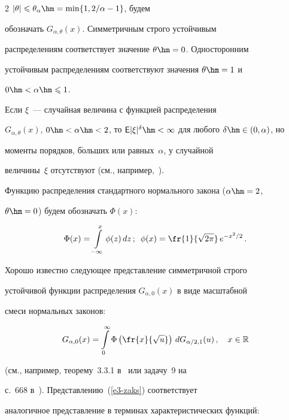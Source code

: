 \begin{multicols}{2}
$|\theta|\leqslant\theta_{\alpha}\hm=\min\{1,{2}/{\alpha}-1\}$, будем

обозначать $G_{\alpha,\theta}(x)$. Сим\-мет\-рич\-ным строго устойчивым

распределениям соответствует значение $\theta\hm=0$. Односторонним

устойчивым распределениям соответствуют значения $\theta\hm=1$ и

$0\hm<\alpha\hm\leqslant1$.



Если $\xi$~--- случайная величина с функцией распределения

$G_{\alpha,\theta}(x)$, $0\hm<\alpha\hm<2$, то ${\sf

E}|\xi|^{\delta}\hm<\infty$ для любого $\delta\hm\in(0,\alpha)$, но

моменты порядков, б$\acute{\mbox{о}}$льших или равных~$\alpha$, у случайной

величины~$\xi$ отсутствуют (см., например,~\cite{Zolotarev1983}).



Функцию распределения стандартного нормального закона ($\alpha\hm=2$,

$\theta\hm=0$) будем обозначать $\Phi(x)$:

$$

\Phi(x)=\int\limits_{-\infty}^x\phi(z)\,dz\,;\enskip

\phi(x)=\fr{1}{\sqrt{2\pi}}\,e^{-x^2/2}\,.

$$

Хорошо известно следующее представление сим\-мет\-рич\-ной строго

устойчивой функции распределения $G_{\alpha,0}(x)$ в виде масштабной

смеси нормальных законов:

\begin{equation}

G_{\alpha,0}(x)=\int\limits_{0}^{\infty}\Phi\left(\fr{x}{\sqrt{u}}\right)\,dG_{\alpha/2,1}(u)\,,\

\ \ x\in\mathbb{R}\label{e3-zaks}

\end{equation}

(см., например, теорему~3.3.1 в~\cite{Zolotarev1983} или задачу~9 на

с.~668 в~\cite{Feller1984}). Представлению~(\ref{e3-zaks}) соответствует

аналогичное представление в терминах характеристических функций:


\end{multicols}

